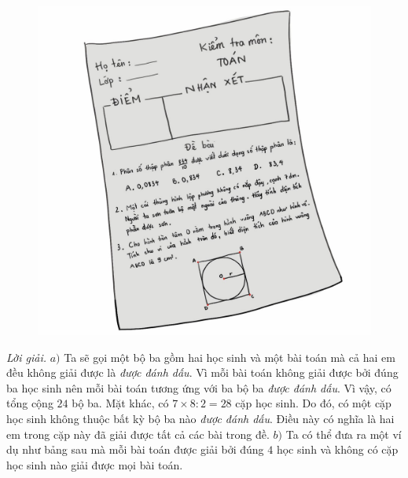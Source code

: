 \begin{multicols}{2}
	\begin{figure}[H]
		\centering
		\vspace*{-10pt}
		\captionsetup{labelformat= empty, justification=centering}
		\includegraphics[width=0.7\linewidth]{Pi4_bai6}
		\vspace*{-5pt}
	\end{figure}
	\textit{Lời giải.} 	$a)$ Ta sẽ gọi một bộ ba gồm hai học sinh và một bài toán mà cả hai em đều không giải được là \textit{được đánh dấu}. Vì mỗi bài toán không giải được bởi đúng ba học sinh nên mỗi bài toán tương ứng với ba bộ ba \textit{được đánh dấu}. Vì vậy, có tổng cộng $24$ bộ ba. Mặt khác, có $7 \times 8 : 2 = 28$ cặp học sinh. Do đó, có một cặp học sinh không thuộc bất kỳ bộ ba nào \textit{được đánh dấu}. Điều này có nghĩa là hai em trong cặp này đã giải được tất cả các bài trong đề.
	\vskip 0.1cm
	$b)$ Ta có thể đưa ra một ví dụ như bảng sau mà mỗi bài toán được giải bởi đúng $4$ học sinh và không có cặp học sinh nào giải được mọi bài toán.
	\begin{table}[H]
		\renewcommand{\arraystretch}{1.2}
	\end{table}
\end{multicols}
